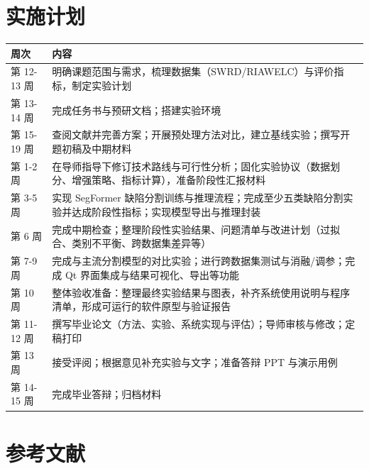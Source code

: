 \documentclass{cjlu_proposal}
\begin{document}
\section{实施计划}
\begin{tabularx}{\textwidth}{p{6.5em}X}
  \toprule
  周次        & 内容                         \\
  \midrule
  第 12-13 周 & 明确课题范围与需求，梳理数据集（SWRD/RIAWELC）与评价指标，制定实验计划 \\
  第 13-14 周 & 完成任务书与预研文档；搭建实验环境 \\
  第 15-19 周 & 查阅文献并完善方案；开展预处理方法对比，建立基线实验；撰写开题初稿及中期材料 \\
  第 1-2 周   & 在导师指导下修订技术路线与可行性分析；固化实验协议（数据划分、增强策略、指标计算），准备阶段性汇报材料 \\
  第 3-5 周   & 实现 SegFormer 缺陷分割训练与推理流程；完成至少五类缺陷分割实验并达成阶段性指标；实现模型导出与推理封装 \\
  第 6 周     & 完成中期检查；整理阶段性实验结果、问题清单与改进计划（过拟合、类别不平衡、跨数据集差异等） \\
  第 7-9 周   & 完成与主流分割模型的对比实验；进行跨数据集测试与消融/调参；完成 Qt 界面集成与结果可视化、导出等功能 \\
  第 10 周    & 整体验收准备：整理最终实验结果与图表，补齐系统使用说明与程序清单，形成可运行的软件原型与验证报告 \\
  第 11-12 周 & 撰写毕业论文（方法、实验、系统实现与评估）；导师审核与修改；定稿打印 \\
  第 13 周    & 接受评阅；根据意见补充实验与文字；准备答辩 PPT 与演示用例 \\
  第 14-15 周 & 完成毕业答辩；归档材料 \\
  \bottomrule
\end{tabularx}

\section{参考文献}

\printbibliography[heading=none]
\end{document}
